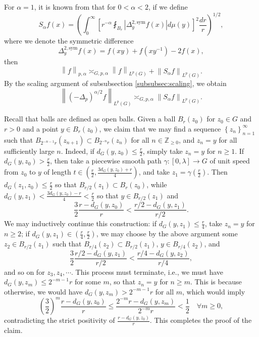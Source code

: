 \documentclass[11pt,reqno]{amsart}
\newcommand{\1}{\mathbf 1}
\begin{document}
For $\alpha=1$, it is known from \cite[Theorem 1.4]{de2021mean} that for $0<\alpha<2$, if we define
\[
S_\alpha f\left(x\right)=\left(\int_0^\infty \left[r^{-\alpha}\fint _{B_r}\left|\Delta_y^{2,\mathrm{sym}}f\left(x\right)\right|d\mu\left(y\right)\right]^2\frac{dr}{r}\right)^{1/2},
\]
where we denote the symmetric difference
\[
\Delta_y^{2,\mathrm{sym}}f\left(x\right)=f\left(xy\right)+f\left(xy^{-1}\right)-2f\left(x\right),
\]
then
\[
\left\|f\right\|_{p,\alpha}\asymp_{G,p,\alpha} \left\|f\right\|_{L^p\left(G\right)}+\left\|S_\alpha f\right\|_{L^p\left(G\right)}.
\]
By the scaling argument of subsubsection \ref{subsubsec:scaling}, we obtain
\[
\left\|\left(-\Delta_p\right)^{\alpha/2}f\right\|_{L^p\left(G\right)}\asymp_{G,p,\alpha} \left\|S_\alpha f\right\|_{L^p\left(G\right)}.
\]

Recall that balls are defined as open balls. Given a ball $B_r\left(z_0\right)$ for $z_0\in G$ and $r>0$ and a point $y\in B_r\left(z_0\right)$, we claim that we may find a sequence $\left\{z_n\right\}_{n=1}^\infty$ such that $B_{2^{-n-1}r}\left(z_{n+1}\right)\subset B_{2^{-n}r}\left(z_{n}\right)$ for all $n\in \mathbb{Z}_{\ge 0}$, and $z_n=y$ for all sufficiently large $n$. Indeed, if $d_G\left(y,z_0\right)\le \frac r2$, simply take $z_n=y$ for $n\ge 1$. If $d_G\left(y,z_0\right)>\frac r2$, then take a piecewise smooth path $\gamma:\left[0,\lambda\right]\to G$ of unit speed from $z_0$ to $y$ of length $t\in\left(\frac r2,\frac{3d_G\left(y,z_0\right)+r}{4}\right)$, and take $z_1=\gamma\left(\frac r2\right)$. Then $d_G\left(z_1,z_0\right)\le \frac r2$ so that $B_{r/2}\left(z_1\right)\subset B_r\left(z_0\right)$, while $d_G\left(y,z_1\right)< \frac{3d_G\left(y,z_0\right)-r}{4}<\frac r2$ so that $y\in B_{r/2}\left(z_1\right)$ and
\[
\frac 32 \frac{r-d_G\left(y,z_0\right)}{r}< \frac{r/2-d_G\left(y,z_1\right)}{r/2}.
\]
We may inductively continue this construction: if $d_G\left(y,z_1\right)\le \frac r4$, take $z_n=y$ for $n\ge 2$; if $d_G\left(y,z_1\right)\in \left(\frac r4,\frac r2\right)$, we may choose by the above argument some $z_2\in B_{r/2}\left(z_1\right)$ such that $B_{r/4}\left(z_2\right)\subset B_{r/2}\left(z_1\right)$, $y\in B_{r/4}\left(z_2\right)$, and
\[
\frac 32 \frac{r/2-d_G\left(y,z_1\right)}{r/2}< \frac{r/4-d_G\left(y,z_2\right)}{r/4},
\]
and so on for $z_3,z_4,\cdots$. This process must terminate, i.e., we must have $d_G\left(y,z_m\right)\le 2^{-m-1}r$ for some $m$, so that $z_n=y$ for $n\ge m$. This is because otherwise, we would have $d_G\left(y,z_m\right)>2^{-m-1}r$ for all $m$, which would imply
\[
\left(\frac 32\right)^m \frac{r-d_G\left(y,z_0\right)}{r}\le \frac{2^{-m}r-d_G\left(y,z_m\right)}{2^{-m}r}<\frac 12\quad \forall m\ge 0,
\]
contradicting the strict positivity of $\frac{r-d_G\left(y,z_0\right)}{r}$. This completes the proof of the claim.
\end{document}
